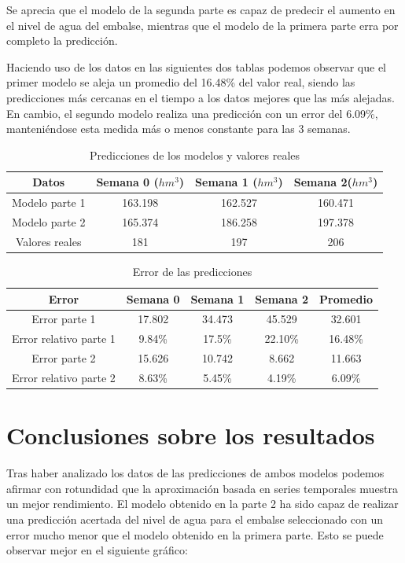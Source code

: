 \documentclass[12pt]{report} %
\begin{document}
Se aprecia que el modelo de la segunda parte es capaz de predecir el aumento en el nivel de agua del embalse, mientras que el modelo de la primera parte erra por completo la predicción.

Haciendo uso de los datos en las siguientes dos tablas podemos observar que el primer modelo se aleja un promedio del 16.48\% del valor real, siendo las predicciones más cercanas en el tiempo a los datos mejores que las más alejadas. En cambio, el segundo modelo realiza una predicción con un error del 6.09\%, manteniéndose esta medida más o menos constante para las 3 semanas.

\begin{table}[H]
    \begin{tabular}{|c|c|c|c|}
    \hline
    Datos & Semana 0 ($hm^3$) & Semana 1 ($hm^3$)& Semana 2($hm^3$)\\
    \hline
    \hline
    Modelo parte 1 & 163.198 & 162.527 & 160.471\\
    Modelo parte 2 & 165.374 & 186.258 & 197.378\\
    Valores reales & 181     & 197     & 206    \\
    \hline
    \end{tabular}
    \caption {Predicciones de los modelos y valores reales}
\end{table}

\begin{table}[H]
\begin{tabular}{|c|c|c|c|c|}
    \hline
    Error & Semana 0 & Semana 1 & Semana 2 & Promedio\\
    \hline
    \hline
    Error parte 1  &  17.802 &  34.473 &  45.529 & 32.601\\
    Error relativo parte 1   & 9.84\% & 17.5\% & 22.10\% & 16.48\%\\
    Error parte 2  &  15.626 &  10.742 &   8.662 & 11.663\\
    Error relativo parte 2   & 8.63\% & 5.45\% & 4.19\% & 6.09\%\\ 
    \hline
    \end{tabular}
    \caption {Error de las predicciones}
\end{table}

\section{Conclusiones sobre los resultados}

Tras haber analizado los datos de las predicciones de ambos modelos podemos afirmar con rotundidad que la aproximación basada en series temporales muestra un mejor rendimiento. El modelo obtenido en la parte 2 ha sido capaz de realizar una predicción acertada del nivel de agua para el embalse seleccionado con un error mucho menor que el modelo obtenido en la primera parte. Esto se puede observar mejor en el siguiente gráfico:
\end{document}
